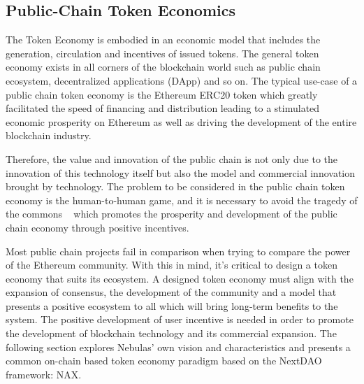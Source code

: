 \subsection{Public-Chain Token Economics}
The Token Economy is embodied in an economic model that includes the generation, circulation and incentives of issued tokens.  The general token economy exists in all corners of the blockchain world such as public chain ecosystem, decentralized applications (DApp) and so on. The typical use-case of a public chain token economy is the Ethereum ERC20 token which greatly facilitated the speed of financing and distribution leading to a stimulated economic prosperity on Ethereum as well as driving the development of the entire blockchain industry. 

Therefore, the value and innovation of the public chain is not only due to the innovation of this technology itself but also the model and commercial innovation brought by technology. The problem to be considered in the public chain token economy is the human-to-human game, and it is necessary to avoid the tragedy of the commons ~\cite{TragedyOfTheCommons} which promotes the prosperity and development of the public chain economy through positive incentives.

Most public chain projects fail in comparison when trying to compare the power of the Ethereum community. With this in mind, it's critical to design a token economy that suits its ecosystem. A designed token economy must align with the expansion of consensus, the development of the community and a model that presents a positive ecosystem to all which will bring long-term benefits to the system. The positive development of user incentive is needed in order to promote the development of blockchain technology and its commercial expansion. The following section explores Nebulas' own vision and characteristics and presents a common on-chain based token economy paradigm based on the NextDAO framework: NAX.
